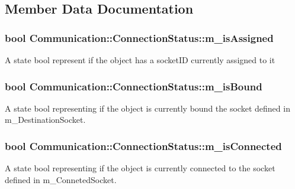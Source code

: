 \subsection{Member Data Documentation}
\hypertarget{class_communication_1_1_connection_status_af8eda66a74967c2e5226203d09d0b1cb}{}
\subsubsection[{m\+\_\+is\+Assigned}]{\setlength{\rightskip}{0pt plus 5cm}bool Communication\+::\+Connection\+Status\+::m\+\_\+is\+Assigned\hspace{0.3cm}{\ttfamily [private]}}\label{class_communication_1_1_connection_status_af8eda66a74967c2e5226203d09d0b1cb}
A state bool represent if the object has a socket\+I\+D currently assigned to it \hypertarget{class_communication_1_1_connection_status_ae89ece76fe699c7d1f943ec4bf5abfd9}{}
\subsubsection[{m\+\_\+is\+Bound}]{\setlength{\rightskip}{0pt plus 5cm}bool Communication\+::\+Connection\+Status\+::m\+\_\+is\+Bound\hspace{0.3cm}{\ttfamily [private]}}\label{class_communication_1_1_connection_status_ae89ece76fe699c7d1f943ec4bf5abfd9}
A state bool representing if the object is currently bound the socket defined in m\+\_\+\+Destination\+Socket. \hypertarget{class_communication_1_1_connection_status_a3dd4daaa2236535df54db8d755e2e6dc}{}
\subsubsection[{m\+\_\+is\+Connected}]{\setlength{\rightskip}{0pt plus 5cm}bool Communication\+::\+Connection\+Status\+::m\+\_\+is\+Connected\hspace{0.3cm}{\ttfamily [private]}}\label{class_communication_1_1_connection_status_a3dd4daaa2236535df54db8d755e2e6dc}
A state bool representing if the object is currently connected to the socket defined in m\+\_\+\+Conneted\+Socket. \hypertarget{class_communication_1_1_connection_status_a75682bfd7179c2de4e54b15f3080cc73}{}
